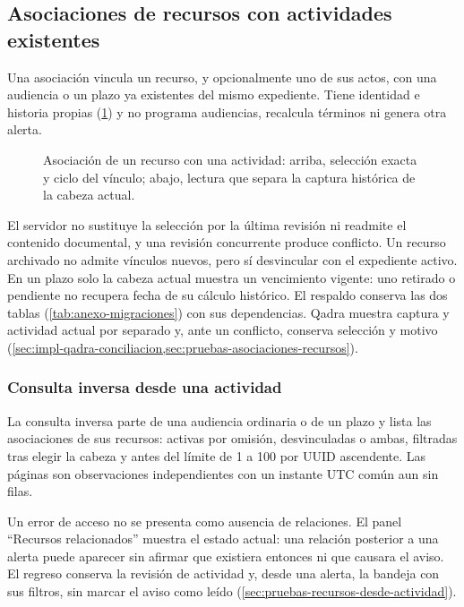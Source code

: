 \subsection{Asociaciones de recursos con actividades existentes}\label{sec:impl-asociaciones-recursos}

Una asociación vincula un recurso, y opcionalmente uno de sus actos, con una audiencia o un plazo ya existentes del mismo expediente. Tiene identidad e historia propias (\cref{fig:impl-rec-asociacion}) y no programa audiencias, recalcula términos ni genera otra alerta.

\begin{figure}[!htbp]
  \centering
  
  \caption{Asociación de un recurso con una actividad: arriba, selección exacta y ciclo del vínculo; abajo, lectura que separa la captura histórica de la cabeza actual.}
  \label{fig:impl-rec-asociacion}
\end{figure}

El servidor no sustituye la selección por la última revisión ni readmite el contenido documental, y una revisión concurrente produce conflicto. Un recurso archivado no admite vínculos nuevos, pero sí desvincular con el expediente activo. En un plazo solo la cabeza actual muestra un vencimiento vigente: uno retirado o pendiente no recupera fecha de su cálculo histórico. El respaldo conserva las dos tablas (\cref{tab:anexo-migraciones}) con sus dependencias. Qadra muestra captura y actividad actual por separado y, ante un conflicto, conserva selección y motivo (\cref{sec:impl-qadra-conciliacion,sec:pruebas-asociaciones-recursos}).

\subsubsection{Consulta inversa desde una actividad}\label{sec:impl-recursos-desde-actividad}

La consulta inversa parte de una audiencia ordinaria o de un plazo y lista las asociaciones de sus recursos: activas por omisión, desvinculadas o ambas, filtradas tras elegir la cabeza y antes del límite de 1 a 100 por UUID ascendente. Las páginas son observaciones independientes con un instante UTC común aun sin filas.

Un error de acceso no se presenta como ausencia de relaciones. El panel \enquote{Recursos relacionados} muestra el estado actual: una relación posterior a una alerta puede aparecer sin afirmar que existiera entonces ni que causara el aviso. El regreso conserva la revisión de actividad y, desde una alerta, la bandeja con sus filtros, sin marcar el aviso como leído (\cref{sec:pruebas-recursos-desde-actividad}).

